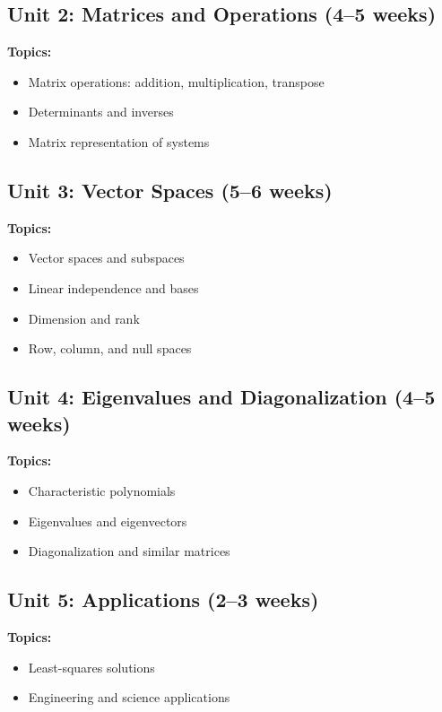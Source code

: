 \documentclass[12pt,oneside]{book}
\begin{document}
\subsection{Unit 2: Matrices and Operations (4--5 weeks)}

\textbf{Topics:}
\begin{itemize}
    \item Matrix operations: addition, multiplication, transpose
    \item Determinants and inverses
    \item Matrix representation of systems
\end{itemize}

\subsection{Unit 3: Vector Spaces (5--6 weeks)}

\textbf{Topics:}
\begin{itemize}
    \item Vector spaces and subspaces
    \item Linear independence and bases
    \item Dimension and rank
    \item Row, column, and null spaces
\end{itemize}

\subsection{Unit 4: Eigenvalues and Diagonalization (4--5 weeks)}

\textbf{Topics:}
\begin{itemize}
    \item Characteristic polynomials
    \item Eigenvalues and eigenvectors
    \item Diagonalization and similar matrices
\end{itemize}

\subsection{Unit 5: Applications (2--3 weeks)}

\textbf{Topics:}
\begin{itemize}
    \item Least-squares solutions
    \item Engineering and science applications
\end{itemize}
\end{document}
